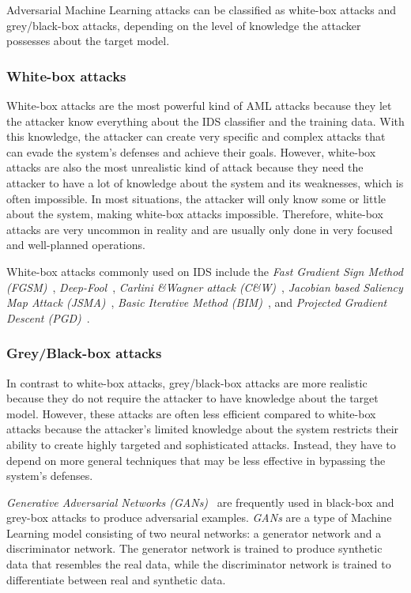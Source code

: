 Adversarial Machine Learning attacks can be classified as white-box attacks and grey/black-box attacks, depending on
the level of knowledge the attacker possesses about the target model.


\subsubsection{White-box attacks}\label{subsubsec:white-box-attacks}

White-box attacks are the most powerful kind of AML attacks because they let the attacker know everything about the
IDS classifier and the training data.
With this knowledge, the attacker can create very specific and complex attacks that can evade the system’s defenses
and achieve their goals.
However, white-box attacks are also the most unrealistic kind of attack because they need the attacker to have a lot of
knowledge about the system and its weaknesses, which is often impossible.
In most situations, the attacker will only know some or little about the system, making white-box attacks impossible.
Therefore, white-box attacks are very uncommon in reality and are usually only done in very focused and well-planned
operations.

White-box attacks commonly used on IDS include the \textit{Fast Gradient Sign Method (FGSM)}~\cite{fgsm},
\textit{Deep-Fool}~\cite{deepfool}, \textit{Carlini \&Wagner attack (C\&W)}~\cite{carlini},
\textit{Jacobian based Saliency Map Attack (JSMA)}~\cite{jsma},
\textit{Basic Iterative Method (BIM)}~\cite{bim},
and \textit{Projected Gradient Descent (PGD)}~\cite{pgd}.

\subsubsection{Grey/Black-box attacks}\label{subsubsec:grey-box-attacks}

In contrast to white-box attacks, grey/black-box attacks are more realistic because they do not require the attacker to
have knowledge about the target model.
However, these attacks are often less efficient compared to white-box attacks because the attacker's limited knowledge
about the system restricts their ability to create highly targeted and sophisticated attacks.
Instead, they have to depend on more general techniques that may be less effective in bypassing the system's defenses.

\textit{Generative Adversarial Networks (GANs)}~\cite{goodfellow2020generative} are frequently used in black-box and grey-box
attacks to produce adversarial examples.
\textit{GANs} are a type of Machine Learning model consisting of two neural networks: a generator network and a discriminator
network.
The generator network is trained to produce synthetic data that resembles the real data, while the discriminator
network is trained to differentiate between real and synthetic data.

